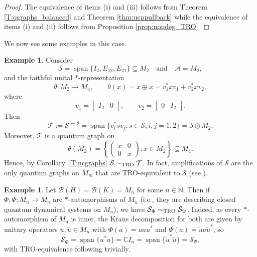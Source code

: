 \documentclass[11pt]{amsart}
\numberwithin{equation}{section}
\theoremstyle{plain}
\theoremstyle{definition}
\newtheorem{example}[theorem]{Example}
\theoremstyle{remark}
\newcommand{\A}{{\mathcal{A}}}
\newcommand{\B}{{\mathcal{B}}}
\renewcommand{\S}{{\mathcal{S}}}
\newcommand{\T}{{\mathcal{T}}}
\newcommand{\bN}{\mathbb{N}}
\newcommand{\qand}{\quad\text{and}\quad}
\newcommand{\wt}{\widetilde}
\newcommand{\spn}{\operatorname{span}}
\begin{document}
\begin{proof}
The equivalence of items (i) and (iii) follows from  Theorem \ref{T:qgraphs_balanced}  and  Theorem \ref{thm:ucppullback} while the equivalence of items (i) and (ii) follows from Proposition \ref{prop:nondeg_TRO}.
\end{proof}

We now see some examples in this case.

\begin{example}
Consider
\[
\S=\operatorname{span}\{I_2,E_{12},E_{21}\}\subseteq M_2
\qand
\A=M_2,
\]
and the faithful unital $*$-representation
\[
\theta \colon M_2\to M_4,\qquad \theta(x)=x\oplus x
= v_1^* x v_1 + v_2^* x v_2,
\]
where
\[
v_1=\begin{bmatrix} I_2 & 0 \end{bmatrix},
\qquad
v_2=\begin{bmatrix} 0 & I_2 \end{bmatrix}.
\]
Then
\[
\T:=\S^{\leftarrow\theta}
=
\operatorname{span}\{v_i^*sv_j:s\in\S, i,j=1,2\}
=
\S\otimes M_2.
\]
Moreover, $\T$ is a quantum graph on
\[
\theta(M_2)
=
\left\{
\begin{pmatrix}
x&0\\
0&x
\end{pmatrix}:x\in M_2
\right\}\subseteq M_4.
\]
Hence, by Corollary~\ref{T:ncgraphs} $\S\sim_{\rm TRO} \T$. In fact, amplifications of $ \S$ are the only quantum graphs on $M_m$ that are TRO-equivalent to $\S$ (see \cite[Example 3.11]{EKT21}).
\end{example}

\begin{example}
\rm Let $\B(H) = \B(K) = M_{n}$ for some $n \in \bN$. Then if $\Phi, \Psi: M_{n}\rightarrow M_{n}$ are $*$-automorphisms of $M_{n}$ (i.e., they are describing closed quantum dynamical systems on $M_{n}$), we have $\S_{\Phi} \sim_{\rm TRO} \S_{\Psi}$. Indeed, as every $*$-automorphism of $M_{n}$ is inner, the Kraus decomposition for both are given by unitary operators $u, \wt{u} \in M_{n}$ with $\Phi(a) = uau^{*}$ and $\Psi(a) = \wt{u}a\wt{u}^{*}$, so 
\[
\S_{\Phi} = \spn\{u^{*}u\} = \mathbb{C}I_{n} = \spn\{\wt{u}^{*}\wt{u}\} = \S_{\Psi},
\]
with TRO-equivalence following trivially. 
\end{example}
\end{document}
